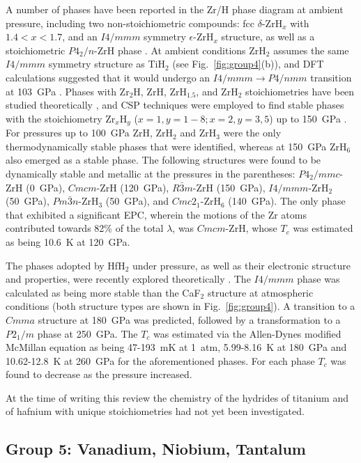 \documentclass[12pt,letterpaper,oneside]{article}
\begin{document}
A number of phases have been reported in the Zr/H phase diagram at ambient pressure, including two non-stoichiometric compounds: fcc $\delta$-ZrH$_x$ with $1.4<x<1.7$, and an $I4/mmm$ symmetry $\epsilon$-ZrH$_x$ structure, as well as a stoichiometric $P4_{2}/n$-ZrH phase \cite{Maimaitiyili:2016}. At ambient conditions ZrH$_2$ assumes the same $I4/mmm$ symmetry structure as TiH$_2$ (see Fig.\ \ref{fig:group4}(b)), and DFT calculations suggested that it would undergo an $I4/mmm\rightarrow P4/nmm$ transition at 103~GPa \cite{Huang:2014}. Phases with Zr$_2$H, ZrH, ZrH$_{1.5}$, and ZrH$_2$ stoichiometries have been studied theoretically \cite{Zhu:2010}, and CSP techniques were employed to find stable phases with the stoichiometry Zr$_x$H$_y$ ($x=1, y=1-8; x=2, y=3, 5$) up to 150~GPa \cite{Li:2017}. For pressures up to 100~GPa ZrH, ZrH$_2$ and ZrH$_3$ were the only thermodynamically stable phases that were identified, whereas at 150~GPa ZrH$_6$ also emerged as a stable phase. The following structures were found to be dynamically stable and metallic at the pressures in the parentheses: $P4_2/mmc$-ZrH (0~GPa), $Cmcm$-ZrH (120~GPa), $R\bar{3}m$-ZrH (150~GPa), $I4/mmm$-ZrH$_2$ (50~GPa), $Pm\bar{3}n$-ZrH$_3$ (50~GPa), and $Cmc2_1$-ZrH$_6$ (140~GPa). The only phase that exhibited a significant EPC, wherein the motions of the Zr atoms contributed towards 82\% of the total $\lambda$, was $Cmcm$-ZrH, whose $T_c$ was estimated as being 10.6~K at 120~GPa.

The phases adopted by HfH$_2$ under pressure, as well as their electronic structure and properties, were recently explored theoretically \cite{Liu:2015}. The $I4/mmm$ phase was calculated as being more stable than the CaF$_2$ structure at atmospheric conditions (both structure types are shown in Fig.\ \ref{fig:group4}). A transition to a $Cmma$ structure at 180~GPa was predicted, followed by a transformation to a $P2_1/m$ phase at 250~GPa. The $T_c$ was estimated via the Allen-Dynes modified McMillan equation as being 47-193~mK at 1~atm, 5.99-8.16~K at 180~GPa and 10.62-12.8~K at 260~GPa for the aforementioned phases. For each phase $T_c$ was found to decrease as the pressure increased. 

At the time of writing this review the chemistry of the hydrides of titanium and of hafnium with unique stoichiometries had not yet been investigated.


\subsection{Group 5: Vanadium, Niobium, Tantalum} 
\end{document}
